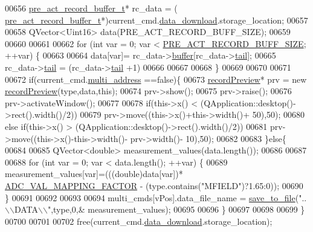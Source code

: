 \begin{DoxyCode}
00656         \hyperlink{a00006_dc/d52/a00183}{pre\_act\_record\_buffer\_t}* rc\_data = (
      \hyperlink{a00006_dc/d52/a00183}{pre\_act\_record\_buffer\_t}*)current\_cmd.\hyperlink{a00004_a5cfeaed4d4f8e51070a324c0ba893ebe}{data\_download}.storage\_location;
00657 
00658         QVector<Uint16> data(PRE\_ACT\_RECORD\_BUFF\_SIZE);
00659 
00660 
00661 
00662         \textcolor{keywordflow}{for} (\textcolor{keywordtype}{int} var = 0; var < \hyperlink{a00006_a18dcecc16ded13fa622e0913e73442e6}{PRE\_ACT\_RECORD\_BUFF\_SIZE}; ++var) \{
00663 
00664             data[var]= rc\_data->\hyperlink{a00006_a5f6608d29ecab36269ae25b2e7afb1f3}{buffer}[rc\_data->\hyperlink{a00006_a3c4762f0dfae85a9efc17a36c6cb84a6}{tail}];
00665             rc\_data->\hyperlink{a00006_a3c4762f0dfae85a9efc17a36c6cb84a6}{tail} = (rc\_data->\hyperlink{a00006_a3c4762f0dfae85a9efc17a36c6cb84a6}{tail} +1)%
00666 
00667 
00668         \}
00669 
00670 
00671 
00672         \textcolor{keywordflow}{if}(current\_cmd.\hyperlink{a00004_a8e69b971c61ced27a7567efd2bf0db59}{multi\_address} ==\textcolor{keyword}{false})\{
00673         \hyperlink{a00073}{recordPreview}* prv = \textcolor{keyword}{new} \hyperlink{a00073}{recordPreview}(type,data,\textcolor{keyword}{this});
00674         prv->show();
00675         prv->raise();
00676         prv->activateWindow();
00677 
00678         \textcolor{keywordflow}{if}(this->x() < (QApplication::desktop()->rect().width()/2))
00679         prv->move((this->x()+this->width()+ 50),50);
00680         \textcolor{keywordflow}{else} \textcolor{keywordflow}{if}(this->x() > (QApplication::desktop()->rect().width()/2))
00681         prv->move((this->x()-this->width()- prv->width()- 10),50);
00682 
00683         \}\textcolor{keywordflow}{else}\{
00684 
00685             QVector<double> measurement\_values(data.length());
00686 
00687 
00688             \textcolor{keywordflow}{for} (\textcolor{keywordtype}{int} var = 0; var < data.length(); ++var) \{
00689                 measurement\_values[var]=(((double)data[var])*
      \hyperlink{a00086_ada92d3eeeec0cbeee41e76a52d145792}{ADC\_VAL\_MAPPING\_FACTOR} - (type.contains(\textcolor{stringliteral}{"MFIELD"})?1.65:0));
00690             \}
00691 
00692 
00693 
00694             multi\_cmds[vPos].data\_file\_name = \hyperlink{a00017_a0114355b9f626345cf77d6f714f51468}{save\_to\_file}(\textcolor{stringliteral}{"..\(\backslash\)\(\backslash\)DATA\(\backslash\)\(\backslash\)"},type,0,&
      measurement\_values);
00695 
00696         \}
00697 
00698 
00699     \}
00700 
00701 
00702     free(current\_cmd.\hyperlink{a00004_a5cfeaed4d4f8e51070a324c0ba893ebe}{data\_download}.storage\_location);

\end{DoxyCode}
